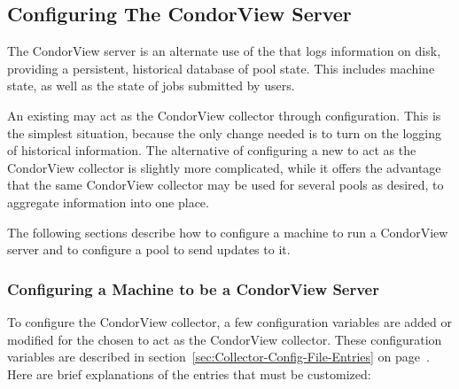 \subsection{\label{sec:Contrib-CondorView-Install}
Configuring The CondorView Server}

The CondorView server is an alternate use of the
that logs information on disk, providing a 
persistent, historical database of pool state.
This includes machine state, as well as the state of jobs submitted by
users.

An existing  may act as the
CondorView collector through configuration.  
This is the simplest situation, because the only change
needed is to turn on the logging of historical information.
The alternative of configuring a new  to act as the
CondorView collector is slightly more complicated,
while it offers the
advantage that the same CondorView collector may be used
for several pools as desired, to aggregate information into one place.

The following sections describe how to configure a machine to run a
CondorView server and to configure a pool to send updates to it. 


\subsubsection{\label{sec:CondorView-Server-Setup}
Configuring a Machine to be a CondorView Server} 


To configure the CondorView collector, a few configuration variables
are added or modified
for the  chosen to act
as the CondorView collector.
These configuration variables are described in 
section~\ref{sec:Collector-Config-File-Entries} on
page~\pageref{sec:Collector-Config-File-Entries}.
Here are brief explanations of the entries that must be customized:


